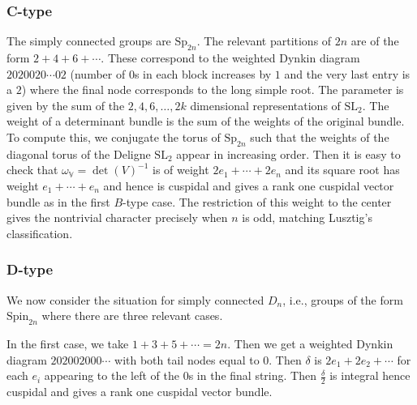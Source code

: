 \documentclass{amsart}
\theoremstyle{definition}
\theoremstyle{remark}
\numberwithin{equation}{section}
\newcommand{\SL}{\mathrm{SL}}
\newcommand{\Sp}{\mathrm{Sp}}
\newcommand{\Spin}{\mathrm{Spin}}
\newcommand{\V}{\mathbb{V}}
\begin{document}
\subsubsection{C-type}

The simply connected groups are $\Sp_{2n}$. The relevant partitions of $2n$ are of the form $2+4+6+\cdots$. These correspond to the weighted Dynkin diagram $2020020\cdots 02$ (number of $0$s in each block increases by $1$ and the very last entry is a $2$) where the final node corresponds to the long simple root. The parameter is given by the sum of the $2, 4, 6,\dots,2k$ dimensional representations of $\SL_2$. The weight of a determinant bundle is the sum of the weights of the original bundle. To compute this, we conjugate the torus of $\Sp_{2n}$ such that the weights of the diagonal torus of the Deligne $\SL_2$ appear in increasing order. Then it is easy to check that $\omega_{\V} = \det(V)^{-1}$ is of weight $2e_1+ \cdots + 2e_n$ and its square root has weight $e_1+\cdots+e_n$ and hence is cuspidal and gives a rank one cuspidal vector bundle as in the first $B$-type case. The restriction of this weight to the center gives the nontrivial character precisely when $n$ is odd, matching Lusztig's classification. 

\subsubsection{D-type}
We now consider the situation for simply connected $D_n$, i.e., groups of the form $\Spin_{2n}$ where there are three relevant cases.

In the first case, we take $1+3+5+\cdots=2n$. Then we get a weighted Dynkin diagram $202002000\cdots$ with both tail nodes equal to $0$. Then $\delta$ is $2e_1 + 2e_2 + \cdots$ for each $e_i$ appearing to the left of the $0$s in the final string. Then $\frac{\delta}{2}$ is integral hence cuspidal and gives a rank one cuspidal vector bundle.
\end{document}
